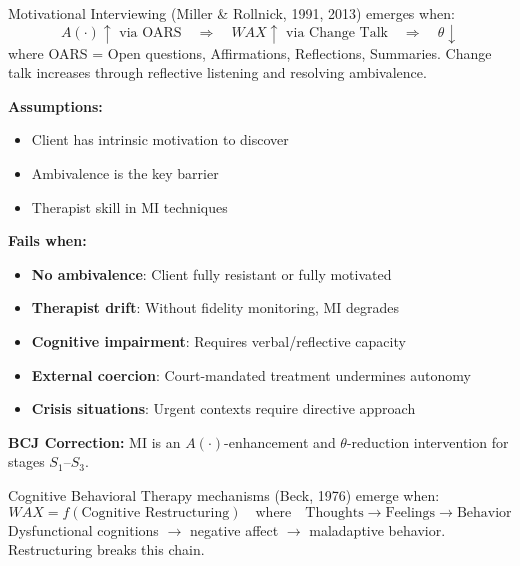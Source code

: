 \begin{theorem}
\label{thm:motivational-interviewing}
Motivational Interviewing (Miller \& Rollnick, 1991, 2013) emerges when:
\begin{equation}
\boxed{A(\cdot) \uparrow \text{ via OARS} \quad \Rightarrow \quad WAX \uparrow \text{ via Change Talk} \quad \Rightarrow \quad \theta \downarrow}
\end{equation}
where OARS = Open questions, Affirmations, Reflections, Summaries. Change talk increases through reflective listening and resolving ambivalence.
\end{theorem}

\begin{tcolorbox}[colback=red!5!white, colframe=red!75!black, title=Boundary Condition: Where MI Fails]
\textbf{Assumptions:}
\begin{itemize}[nosep]
\item Client has intrinsic motivation to discover
\item Ambivalence is the key barrier
\item Therapist skill in MI techniques
\end{itemize}

\textbf{Fails when:}
\begin{itemize}[nosep]
\item \textbf{No ambivalence}: Client fully resistant or fully motivated
\item \textbf{Therapist drift}: Without fidelity monitoring, MI degrades
\item \textbf{Cognitive impairment}: Requires verbal/reflective capacity
\item \textbf{External coercion}: Court-mandated treatment undermines autonomy
\item \textbf{Crisis situations}: Urgent contexts require directive approach
\end{itemize}

\textbf{BCJ Correction:} MI is an $A(\cdot)$-enhancement and $\theta$-reduction intervention for stages $S_1$--$S_3$.
\end{tcolorbox}


\begin{theorem}
\label{thm:cbt-mechanisms}
Cognitive Behavioral Therapy mechanisms (Beck, 1976) emerge when:
\begin{equation}
\boxed{WAX = f(\text{Cognitive Restructuring}) \quad \text{where} \quad \text{Thoughts} \to \text{Feelings} \to \text{Behavior}}
\end{equation}
Dysfunctional cognitions $\to$ negative affect $\to$ maladaptive behavior. Restructuring breaks this chain.
\end{theorem}

